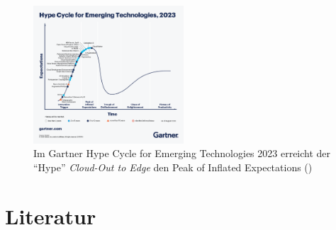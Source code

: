 \documentclass[
  11pt,
  a4paperpaper,
  oneside, openany  ,captions=tableheading
]{scrbook}
\theoremstyle{definition}
\theoremstyle{remark}
\begin{document}
\begin{figure}[H]

{\centering \includegraphics[width=0.5\textwidth,height=\textheight]{images/gartner_hypecycle_2023.png}

}

\caption{Im Gartner Hype Cycle for Emerging Technologies 2023 erreicht
der ``Hype'' \emph{Cloud-Out to Edge} den Peak of Inflated Expectations
()}

\end{figure}%

\chapter*{Literatur}\label{literatur}

\end{document}
